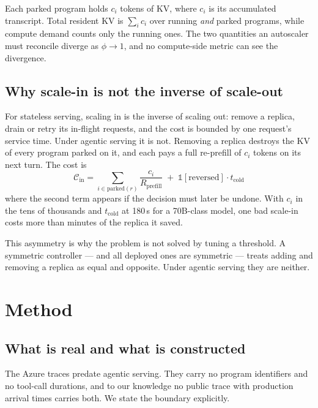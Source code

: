 \documentclass[sigconf,nonacm]{acmart}
\begin{document}
Each parked program holds $c_i$ tokens of KV, where $c_i$ is its
accumulated transcript. Total resident KV is $\sum_i c_i$ over running
\emph{and} parked programs, while compute demand counts only the running
ones. The two quantities an autoscaler must reconcile diverge as
$\phi\to1$, and no compute-side metric can see the divergence.

\subsection{Why scale-in is not the inverse of scale-out}

For stateless serving, scaling in is the inverse of scaling out: remove a
replica, drain or retry its in-flight requests, and the cost is bounded
by one request's service time. Under agentic serving it is not. Removing
a replica destroys the KV of every program parked on it, and each pays a
full re-prefill of $c_i$ tokens on its next turn. The cost is
\begin{equation}
\mathcal{C}_{\text{in}} = \sum_{i \in \text{parked}(r)}
\frac{c_i}{R_{\text{prefill}}}
\;+\; \mathbb{1}[\text{reversed}]\cdot t_{\text{cold}}
\label{eq:scaleincost}
\end{equation}
where the second term appears if the decision must later be undone. With
$c_i$ in the tens of thousands and $t_{\text{cold}}$ at 180\,s for a
70B-class model, one bad scale-in costs more than minutes of the replica
it saved.

This asymmetry is why the problem is not solved by tuning a threshold. A
symmetric controller --- and all deployed ones are symmetric --- treats
adding and removing a replica as equal and opposite. Under agentic
serving they are neither.

\section{Method}
\label{sec:method}

\subsection{What is real and what is constructed}
\label{sec:construction}

The Azure traces predate agentic serving. They carry no program
identifiers and no tool-call durations, and to our knowledge no public
trace with production arrival times carries both. We state the boundary
explicitly.
\end{document}
